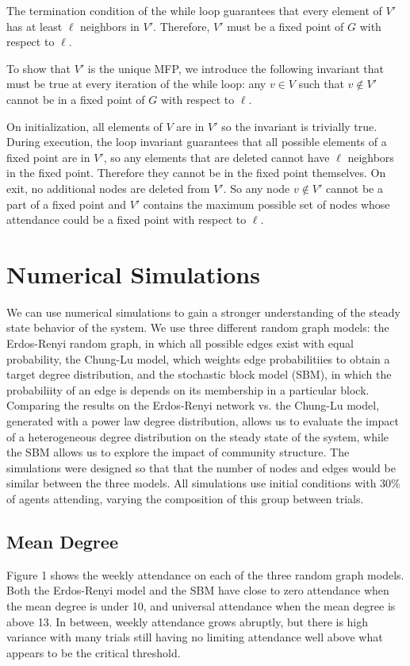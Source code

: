 \documentclass[12pt]{article}
\begin{document}
  The termination condition of the while loop guarantees that every element of $V'$ has at least $\ell$ neighbors in $V'$.  Therefore, $V'$ must be a fixed point of $G$ with respect to $\ell$.  
  
  To show that $V'$ is the unique MFP, we introduce the following invariant that must be true at every iteration of the while loop: any $v \in V$ such that $v \notin V'$ cannot be in a fixed point of $G$ with respect to $\ell$.

  On initialization, all elements of $V$ are in $V'$ so the invariant is trivially true.  During execution, the loop invariant guarantees that all possible elements of a fixed point are in $V'$, so any elements that are deleted cannot have $\ell$ neighbors in the fixed point.  Therefore they cannot be in the fixed point themselves.  On exit, no additional nodes are deleted from $V'$.  So any node $v \notin V'$ cannot be a part of a fixed point and $V'$ contains the maximum possible set of nodes whose attendance could be a fixed point with respect to $\ell$. 

\section{Numerical Simulations}
We can use numerical simulations to gain a stronger understanding of the steady state behavior of the system.  We use three different random graph models: the Erdos-Renyi random graph, in which all possible edges exist with equal probability, the Chung-Lu model, which weights edge probabilitiies to obtain a target degree distribution, and the stochastic block model (SBM), in which the probabiliity of an edge is depends on its membership in a particular block.  Comparing the results on the Erdos-Renyi network vs. the Chung-Lu model, generated with a power law degree distribution, allows us to evaluate the impact of a heterogeneous degree distribution on the steady state of the system, while the SBM allows us to explore the impact of community structure.  The simulations were designed so that that the number of nodes and edges would be similar between the three models.  All simulations use initial conditions with 30\% of agents attending, varying the composition of this group between trials.

\subsection{Mean Degree}
Figure 1 shows the weekly attendance on each of the three random graph models.  Both the Erdos-Renyi model and the SBM have close to zero attendance when the mean degree is under 10, and universal attendance when the mean degree is above 13.  In between, weekly attendance grows abruptly, but there is high variance with many trials still having no limiting attendance well above what appears to be the critical threshold.
\end{document}
